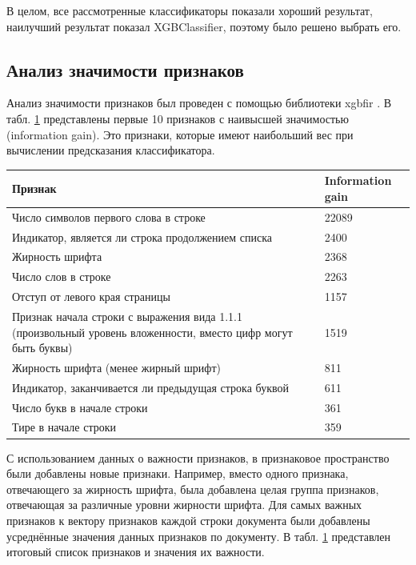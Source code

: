 \documentclass{ProcISPRAS}
\begin{document}
В целом, все рассмотренные классификаторы показали хороший результат, наилучший результат показал XGBClassifier, поэтому было решено выбрать его.

\subsection{Анализ значимости признаков}

Анализ значимости признаков был проведен с помощью библиотеки xgbfir \cite{xgbfir} . В табл. \ref{tab:features_importances} представлены первые 10 признаков с наивысшей значимостью (information gain). Это признаки, которые имеют наибольший вес при вычислении предсказания классификатора.

\begin{table}[ht]
    \begin{tabular}{p{}p{}}
    \toprule
    \textbf{Признак} & \textbf{Information gain} \\
    \midrule
        Число символов первого слова в строке & 22089 \\
        Индикатор, является ли строка продолжением списка & 2400 \\
        Жирность шрифта & 2368 \\
        Число слов в строке & 2263 \\
        Отступ от левого края страницы & 1157 \\
        Признак начала строки с выражения вида 1.1.1 (произвольный уровень вложенности, вместо цифр могут быть буквы) & 1519 \\
        Жирность шрифта (менее жирный шрифт) & 811 \\
        Индикатор, заканчивается ли предыдущая строка буквой & 611 \\
        Число букв в начале строки & 361 \\
        Тире в начале строки & 359 \\
    \bottomrule
    \end{tabular}
    \label{tab:features_importances}
\end{table}

С использованием данных о важности признаков, в признаковое пространство были добавлены новые признаки. Например, вместо одного признака, отвечающего за жирность шрифта, была добавлена целая группа признаков, отвечающая за различные уровни жирности шрифта. Для самых важных признаков к вектору признаков каждой строки документа были добавлены усреднённые значения данных признаков по документу. В табл. \ref{tab:features_importances} представлен итоговый список признаков и значения их важности.
\end{document}
